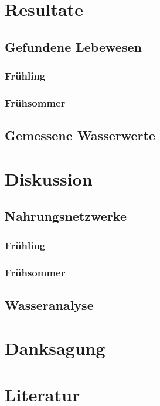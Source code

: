 \documentclass{article}
\begin{document}
    

\section{Resultate}

    \subsection{Gefundene Lebewesen}
    
    
        \subsubsection{Frühling}
        
        \subsubsection{Frühsommer}
        
    \subsection{Gemessene Wasserwerte}


\section{Diskussion}

    \subsection{Nahrungsnetzwerke}
        
    
        \subsubsection{Frühling}
        
        \subsubsection{Frühsommer}
        
    
    \subsection{Wasseranalyse}
    

\section{Danksagung}

\section{Literatur}
\end{document}
